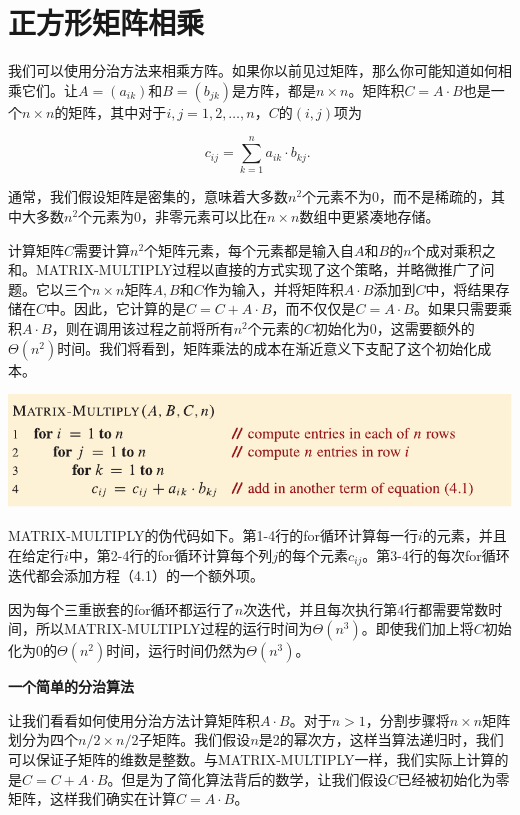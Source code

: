 \documentclass[lang=cn,newtx,10pt,scheme=chinese]{elegantbook}
\begin{document}
\section{正方形矩阵相乘}\label{section-4.1}

我们可以使用分治方法来相乘方阵。如果你以前见过矩阵，那么你可能知道如何相乘它们。让$A=\left(a_{i k}\right)$和$B=\left(b_{j k}\right)$是方阵，都是$n \times n$。矩阵积$C=A \cdot B$也是一个$n \times n$的矩阵，其中对于$i, j=1,2, \ldots, n$，$C$的$(i, j)$项为

\begin{equation}
c_{i j}=\sum_{k=1}^n a_{i k} \cdot b_{k j} \text {. }
\end{equation}

通常，我们假设矩阵是密集的，意味着大多数$n^2$个元素不为0，而不是稀疏的，其中大多数$n^2$个元素为0，非零元素可以比在$n \times n$数组中更紧凑地存储。

计算矩阵$C$需要计算$n^2$个矩阵元素，每个元素都是输入自$A$和$B$的$n$个成对乘积之和。MATRIX-MULTIPLY过程以直接的方式实现了这个策略，并略微推广了问题。它以三个$n \times n$矩阵$A, B$和$C$作为输入，并将矩阵积$A \cdot B$添加到$C$中，将结果存储在$C$中。因此，它计算的是$C=C+A \cdot B$，而不仅仅是$C=A \cdot B$。如果只需要乘积$A \cdot B$，则在调用该过程之前将所有$n^2$个元素的$C$初始化为0，这需要额外的$\Theta\left(n^2\right)$时间。我们将看到，矩阵乘法的成本在渐近意义下支配了这个初始化成本。

\includegraphics{算法导论第四版插图/第四章/普通矩阵相乘算法.pdf}

MATRIX-MULTIPLY的伪代码如下。第1-4行的for循环计算每一行$i$的元素，并且在给定行$i$中，第2-4行的for循环计算每个列$j$的每个元素$c_{i j}$。第3-4行的每次for循环迭代都会添加方程（4.1）的一个额外项。

因为每个三重嵌套的for循环都运行了$n$次迭代，并且每次执行第4行都需要常数时间，所以MATRIX-MULTIPLY过程的运行时间为$\Theta\left(n^3\right)$。即使我们加上将$C$初始化为0的$\Theta\left(n^2\right)$时间，运行时间仍然为$\Theta\left(n^3\right)$。

\textbf{一个简单的分治算法}

让我们看看如何使用分治方法计算矩阵积$A \cdot B$。对于$n>1$，分割步骤将$n \times n$矩阵划分为四个$n / 2 \times n / 2$子矩阵。我们假设$n$是2的幂次方，这样当算法递归时，我们可以保证子矩阵的维数是整数。与MATRIX-MULTIPLY一样，我们实际上计算的是$C=C+A \cdot B$。但是为了简化算法背后的数学，让我们假设$C$已经被初始化为零矩阵，这样我们确实在计算$C=A \cdot B$。
\end{document}
